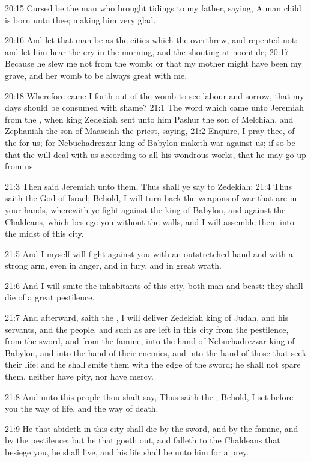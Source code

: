20:15 Cursed be the man who brought tidings to my father, saying, A man child is born unto thee; making him very glad.

20:16 And let that man be as the cities which the \LORD overthrew, and repented not: and let him hear the cry in the morning, and the shouting at noontide; 20:17 Because he slew me not from the womb; or that my mother might have been my grave, and her womb to be always great with me.

20:18 Wherefore came I forth out of the womb to see labour and sorrow, that my days should be consumed with shame?  21:1 The word which came unto Jeremiah from the \LORD, when king Zedekiah sent unto him Pashur the son of Melchiah, and Zephaniah the son of Maaseiah the priest, saying, 21:2 Enquire, I pray thee, of the \LORD for us; for Nebuchadrezzar king of Babylon maketh war against us; if so be that the \LORD will deal with us according to all his wondrous works, that he may go up from us.

21:3 Then said Jeremiah unto them, Thus shall ye say to Zedekiah: 21:4 Thus saith the \LORD God of Israel; Behold, I will turn back the weapons of war that are in your hands, wherewith ye fight against the king of Babylon, and against the Chaldeans, which besiege you without the walls, and I will assemble them into the midst of this city.

21:5 And I myself will fight against you with an outstretched hand and with a strong arm, even in anger, and in fury, and in great wrath.

21:6 And I will smite the inhabitants of this city, both man and beast: they shall die of a great pestilence.

21:7 And afterward, saith the \LORD, I will deliver Zedekiah king of Judah, and his servants, and the people, and such as are left in this city from the pestilence, from the sword, and from the famine, into the hand of Nebuchadrezzar king of Babylon, and into the hand of their enemies, and into the hand of those that seek their life: and he shall smite them with the edge of the sword; he shall not spare them, neither have pity, nor have mercy.

21:8 And unto this people thou shalt say, Thus saith the \LORD; Behold, I set before you the way of life, and the way of death.

21:9 He that abideth in this city shall die by the sword, and by the famine, and by the pestilence: but he that goeth out, and falleth to the Chaldeans that besiege you, he shall live, and his life shall be unto him for a prey.

